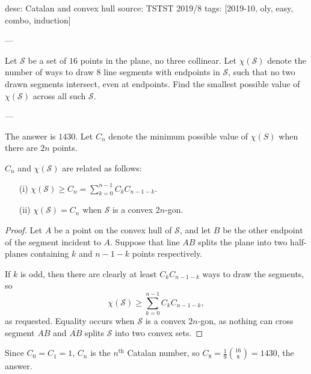 desc: Catalan and convex hull
source: TSTST 2019/8
tags: [2019-10, oly, easy, combo, induction]

---

Let $\mathcal S$ be a set of $16$ points in the plane, no three collinear. Let $\chi(\mathcal S)$ denote the number of ways to draw $8$ line segments with endpoints in $\mathcal S$, such that no two drawn segments intersect, even at endpoints. Find the smallest possible value of $\chi(\mathcal S)$ across all such $\mathcal S$.

---

The answer is $1430$. Let $C_n$ denote the minimum possible value of $\chi(S)$ when there are $2n$ points.
\begin{claim*}
    $C_n$ and $\chi(\mathcal S)$ are related as follows:
    \begin{itemize}
        \item[(i)] $\chi(\mathcal S)\ge C_n=\sum_{k=0}^{n-1}C_kC_{n-1-k}$.
        \item[(ii)] $\chi(\mathcal S)=C_n$ when $\mathcal S$ is a convex $2n$-gon.
    \end{itemize}
\end{claim*}
\begin{proof}
    Let $A$ be a point on the convex hull of $\mathcal S$, and let $B$ be the other endpoint of the segment incident to $A$. Suppose that line $AB$ splits the plane into two half-planes containing $k$ and $n-1-k$ points respectively.

    If $k$ is odd, then there are clearly at least $C_kC_{n-1-k}$ ways to draw the segments, so \[\chi(\mathcal S)\ge\sum_{k=0}^{n-1}C_kC_{n-1-k},\]
    as requested. Equality occurs when $\mathcal S$ is a convex $2n$-gon, as nothing can cross segment $AB$ and $\overline{AB}$ splits $\mathcal S$ into two convex sets.
\end{proof}

Since $C_0=C_1=1$, $C_n$ is the $n^\text{th}$ Catalan number, so $C_8=\tfrac19\binom{16}8=1430$, the answer.
